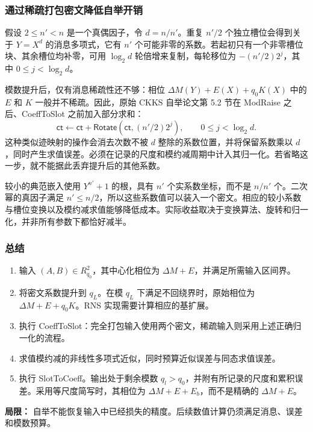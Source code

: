 \subsubsection{通过稀疏打包密文降低自举开销}
\label{subsubsec:ckks-bootstrapping-time-reduction}

假设 $2\leq n'<n$ 是一个真偶因子，令 $d=n/n'$。重复 $n'/2$ 个独立槽位会得到关于 $Y=X^d$ 的消息多项式，它有 $n'$ 个可能非零的系数。若起初只有一个非零槽位块、其余槽位均补零，可用 $\log_2 d$ 轮倍增来复制，每轮移位为 $-(n'/2)2^j$，其中 $0\leq j<\log_2d$。

模数提升后，仅有消息稀疏性还不够：相位 $\Delta M(Y)+E(X)+q_0K(X)$ 中的 $E$ 和 $K$ 一般并不稀疏。因此，原始 CKKS 自举论文第 5.2 节在 ModRaise 之后、CoeffToSlot 之前加入部分求和：
\[
\textsf{ct}\leftarrow\textsf{ct}+\textsf{Rotate}(\textsf{ct},(n'/2)2^j),
\qquad 0\leq j<\log_2d.
\]
这种类似迹映射的操作会消去次数不被 $d$ 整除的系数位置，并将保留系数乘以 $d$，同时产生求值误差。必须在记录的尺度和模约减周期中计入其归一化。若省略这一步，就不能据此丢弃提升后的其他系数。

较小的典范嵌入使用 $Y^{n'}+1$ 的根，具有 $n'$ 个实系数坐标，而不是 $n/n'$ 个。二次幂的真因子满足 $n'\leq n/2$，所以这些系数值可以装入一个密文。相应的较小系数与槽位变换以及模约减求值能够降低成本。实际收益取决于变换算法、旋转和归一化，并非所有参数下都恰好减半。

\subsubsection{总结}
\label{subsubsec:ckks-bootstrapping-summary}

\begin{tcolorbox}[title={\textbf{\tboxlabel{\ref*{subsubsec:ckks-bootstrapping-summary}} CKKS 自举}}]
\begin{enumerate}
\item 输入 $(A,B)\in R_{q_0}^2$，其中心化相位为 $\Delta M+E$，并满足所需输入区间界。
\item 将密文系数提升到 $q_L$。在模 $q_L$ 下满足不回绕界时，原始相位为 $\Delta M+E+q_0K$。RNS 实现需要计算相应的基扩展。
\item 执行 CoeffToSlot：完全打包输入使用两个密文，稀疏输入则采用上述正确归一化的流程。
\item 求值模约减的非线性多项式近似，同时预算近似误差与同态求值误差。
\item 执行 SlotToCoeff。输出处于剩余模数 $q_l>q_0$，并附有所记录的尺度和累积误差。采用等尺度简写时，其相位为 $\Delta M+E+E_b$，而不是精确的 $\Delta M+E$。
\end{enumerate}
\textbf{局限：} 自举不能恢复输入中已经损失的精度。后续数值计算仍须满足消息、误差和模数预算。
\end{tcolorbox}

